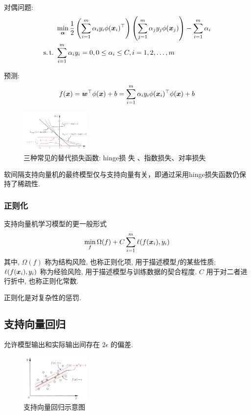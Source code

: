 对偶问题:
\begin{align*}
    &\min_{\bm\alpha}\frac{1}{2}\left( \sum_{i=1}^m \alpha_i y_i\phi(\bx_i)^\top\right)\left( \sum_{j=1}^m \alpha_j y_j\phi(\bx_j) \right)-\sum_{i=1}^m\alpha_i\\
    \st&\sum_{i=1}^m\alpha_i y_i=0, 0\le \alpha_i\le C, i=1,2,\dots,m
\end{align*}

预测:
\begin{align*}
    f(\bm{x})=\bm{w}^\top\phi(\bm{x})+b=\sum_{i=1}^m\alpha_iy_i\phi(\bm{x}_i)^\top\phi(\bm{x})+b
\end{align*}

\begin{figure}[!htb]
    \centering
    \includegraphics[width=0.309\textwidth]{pic/ML6/三种常见的替代损失函数}
    \caption{三种常见的替代损失函数: hinge损 失 、指数损失、对率损失}
\end{figure}

软间隔支持向量机的最终模型仅与支持向量有关，即通过采用hinge损失函数仍保持了稀疏性. 



\subsubsection{正则化}
支持向量机学习模型的更一般形式
\begin{align*}
    \min_f\Omega(f)+C\sum_{i=1}^m\ell(f(\bm{x}_i), y_i)
\end{align*}
其中, $\Omega(f)$ 称为结构风险, 也称正则化项, 用于描述模型$f$的某些性质; $\ell(f(\bm{x}_i), y_i)$ 称为经验风险, 用于描述模型与训练数据的契合程度. $C$ 用于对二者进行折中, 也称正则化常数. 

正则化是对复杂性的惩罚. 

\subsection{支持向量回归}
允许模型输出和实际输出间存在 $2\epsilon$ 的偏差.
\begin{figure}[!htb]
    \centering
    \includegraphics[width=0.309\textwidth]{pic/ML6/支持向量回归示意图}
    \caption{支持向量回归示意图}
\end{figure}

